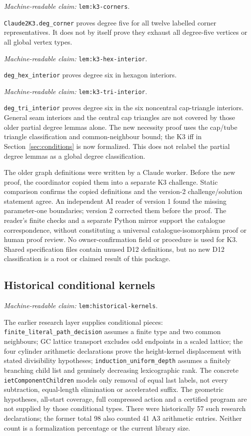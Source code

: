 \documentclass[11pt]{amsart}
\newcommand{\record}[1]{\nolinkurl{#1}}
\newcommand{\claimid}[1]{\par\nopagebreak\noindent\textit{Machine-readable claim:} \record{#1}.\par}
\theoremstyle{definition}\newtheorem{definition}{Definition}
\begin{document}
\label{lem:k3-corners}\claimid{lem:k3-corners}
\record{Claude2K3.deg_corner} proves degree five for all twelve labelled
corner representatives. It does not by itself prove they exhaust all
degree-five vertices or all global vertex types.
\label{lem:k3-hex-interior}\claimid{lem:k3-hex-interior}
\record{deg_hex_interior} proves degree six in hexagon interiors.
\label{lem:k3-tri-interior}\claimid{lem:k3-tri-interior}
\record{deg_tri_interior} proves degree six in the six noncentral cap-triangle interiors.
General seam interiors and the central cap triangles are not covered
by those older partial degree lemmas alone. The new necessity proof
uses the cap/tube triangle classification and common-neighbour bound;
the K3 iff in Section~\ref{sec:conditions} is now formalized. This does
not relabel the partial degree lemmas as a global degree classification.

The older graph definitions were written by a Claude worker. Before
the new proof, the coordinator copied them into a separate K3 challenge.
Static comparison confirms the copied definitions and the version-2
challenge/solution statement agree. An independent AI reader of version 1
found the missing parameter-one boundaries; version 2 corrected them
before the proof. The reader's finite checks and a separate Python mirror
support the catalogue correspondence, without constituting a universal
catalogue-isomorphism proof or human proof review. No owner-confirmation
field or procedure is used for K3. Shared specification files contain
unused D12 definitions, but no new D12 classification is a root or
claimed result of this package.

\subsection{Historical conditional kernels}\label{sec:historical-formal}
\label{lem:historical-kernels}\claimid{lem:historical-kernels}
The earlier research layer supplies conditional pieces:
\record{finite_literal_path_decision} assumes a finite type and two
common neighbours; GC lattice transport excludes odd endpoints in a
scaled lattice; the four cylinder arithmetic declarations prove the
height-kernel displacement with stated divisibility hypotheses;
\record{induction_uniform_depth} assumes a finitely branching child
list and genuinely decreasing lexicographic rank. The concrete
\record{ietComponentChildren} models only removal of equal last labels,
not every subtraction, equal-length elimination or accelerated suffix.
The geometric hypotheses, all-start coverage, full compressed action
and a certified program are not supplied by those conditional types.
There were historically 57 such research declarations; the former
total 98 also counted 41 A3 arithmetic entries. Neither count is a
formalization percentage or the current library size.
\end{document}
